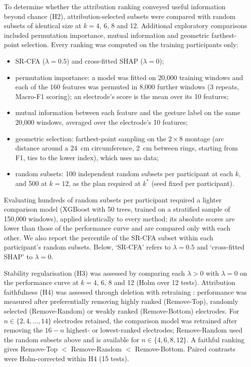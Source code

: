 To determine whether the attribution ranking conveyed useful information beyond chance (H2), attribution-selected subsets were compared with random subsets of identical size at $k = 4$, 6, 8 and 12. Additional exploratory comparisons included permutation importance, mutual information and geometric farthest-point selection. Every ranking was computed on the training participants only:
\begin{itemize}
\item SR-CFA ($\lambda = 0.5$) and cross-fitted SHAP ($\lambda = 0$);
\item permutation importance: a model was fitted on 20,000 training windows and each of the 160 features was permuted in 8,000 further windows (3 repeats, Macro-F1 scoring); an electrode's score is the mean over its 10 features;
\item mutual information between each feature and the gesture label on the same 20,000 windows, averaged over the electrode's 10 features;
\item geometric selection: farthest-point sampling on the $2 \times 8$ montage (arc distance around a 24~cm circumference, 2~cm between rings, starting from F1, ties to the lower index), which uses no data;
\item random subsets: 100 independent random subsets per participant at each $k$, and 500 at $k = 12$, as the plan required at $k^*$ (seed fixed per participant).
\end{itemize}
Evaluating hundreds of random subsets per participant required a lighter comparison model (XGBoost with 50 trees, trained on a stratified sample of 150,000 windows), applied identically to every method; its absolute scores are lower than those of the performance curve and are compared only with each other.  We also report the percentile of the SR-CFA subset within each participant's random subsets. Below, `SR-CFA' refers to $\lambda = 0.5$ and `cross-fitted SHAP' to $\lambda = 0$.

Stability regularisation (H3) was assessed by comparing each $\lambda > 0$ with $\lambda = 0$ on the performance curve at $k = 4$, 6, 8 and 12 (Holm over 12 tests). Attribution faithfulness (H4) was assessed through deletion with retraining \citep{samek2017evaluating,hooker2019benchmark}: performance was measured after preferentially removing highly ranked (Remove-Top), randomly selected (Remove-Random) or weakly ranked (Remove-Bottom) electrodes. For $n \in \{2, 4, \ldots, 14\}$ electrodes retained, the comparison model was retrained after removing the $16 - n$ highest- or lowest-ranked electrodes; Remove-Random used the random subsets above and is available for $n \in \{4, 6, 8, 12\}$. A faithful ranking gives Remove-Top $<$ Remove-Random $<$ Remove-Bottom. Paired contrasts were Holm-corrected within H4 (15 tests).


